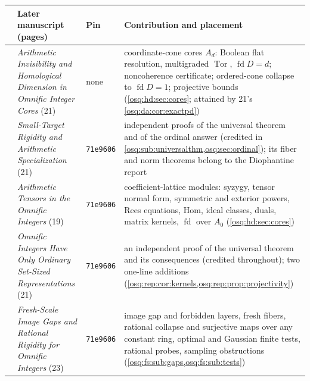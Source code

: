 \documentclass[11pt,letterpaper]{article}
\numberwithin{equation}{section}
\theoremstyle{definition}
\theoremstyle{remark}
\theoremstyle{plain}
\newcommand{\Tor}{\operatorname{Tor}}
\newcommand{\fd}{\operatorname{fd}}
\begin{document}
\begin{center}\small
\begin{tabular}{@{}>{\raggedright\arraybackslash}p{}>{\raggedright\arraybackslash}p{}>{\raggedright\arraybackslash}p{}>{\raggedright\arraybackslash}p{}@{}}
\toprule
& Later manuscript (pages) & Pin & Contribution and placement\\
\midrule
12 & \emph{Arithmetic Invisibility and Homological Dimension in Omnific Integer Cores} (21) & none & coordinate-cone cores $A_d$: Boolean flat resolution, multigraded $\Tor$, $\fd D=d$; noncoherence certificate; ordered-cone collapse to $\fd D=1$; projective bounds (\cref{osq:hd:sec:cores}; attained by 21's \cref{osq:da:cor:exactpd})\\
13 & \emph{Small-Target Rigidity and Arithmetic Specialization} (21) & \texttt{71e9606} & independent proofs of the universal theorem and of the ordinal answer (credited in \cref{osq:sub:universalthm,osq:sec:ordinal}); its fiber and norm theorems belong to the Diophantine report \cite{RepoOdg}\\
14 & \emph{Arithmetic Tensors in the Omnific Integers} (19) & \texttt{71e9606} & coefficient-lattice modules: syzygy, tensor normal form, symmetric and exterior powers, Rees equations, Hom, ideal classes, duals, matrix kernels, $\fd$ over $A_0$ (\cref{osq:hd:sec:cores})\\
15 & \emph{Omnific Integers Have Only Ordinary Set-Sized Representations} (21) & \texttt{71e9606} & an independent proof of the universal theorem and its consequences (credited throughout); two one-line additions (\cref{osq:rep:cor:kernels,osq:rep:prop:projectivity})\\
16 & \emph{Fresh-Scale Image Gaps and Rational Rigidity for Omnific Integers} (23) & \texttt{71e9606} & image gap and forbidden layers, fresh fibers, rational collapse and surjective maps over any constant ring, optimal and Gaussian finite tests, rational probes, sampling obstructions (\cref{osq:fs:sub:gaps,osq:fs:sub:tests})\\
\bottomrule
\end{tabular}
\end{center}
\end{document}

